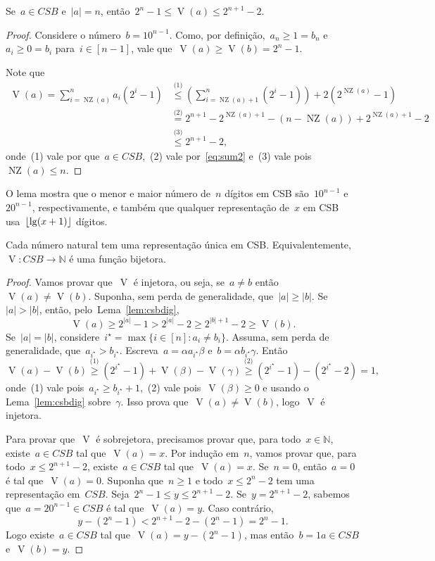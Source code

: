 \documentclass[main.tex]{subfiles}
\newcommand{\NZ}{\operatorname{NZ}}
\newcommand{\CSB}{\textit{CSB}}
\renewcommand{\V}{\operatorname{V}}
\begin{document}
\begin{lemma} \label{lem:csbdig}
	Se~$a \in \CSB$ e~$|a| = n$, então~$2^n - 1 \leq \V(a) \leq 2^{n+1}-2$.
\end{lemma}
\begin{proof}
	Considere o número~$b = 10^{n-1}$. Como, por definição,~$a_n \geq 1 = b_n$ e~$a_i \geq 0 = b_i$ para~$i \in [n - 1]$, vale que~$\V(a) \geq \V(b) = 2^n - 1$.

	Note que
	\begin{align*}
	\V(a) = \sum\limits_{i = \NZ(a)}^n{a_i (2^i - 1)} &\stackrel{\text{(1)}}{\leq} \left(\sum\limits_{i = \NZ(a) + 1}^n (2^i - 1)\right) + 2 (2^{\NZ(a)} - 1) \\
	&\stackrel{\text{(2)}}{=} 2^{n+1} - 2^{\NZ(a)+1} - (n - \NZ(a)) + 2^{\NZ(a) + 1} - 2 \\
	&\stackrel{\text{(3)}}{\leq} 2^{n+1} - 2,
	\end{align*}
	onde~(1) vale por que~$a \in \CSB$,~(2) vale por~\eqref{eq:sum2} e~(3) vale pois~$\NZ(a) \leq n$.
\end{proof}

O lema mostra que o menor e maior número de~$n$ dígitos em CSB são~$10^{n-1}$ e~$20^{n-1}$, respectivamente, e também que qualquer representação de~$x$ em CSB usa~$\lfloor\lg(x + 1)\rfloor$ dígitos.

\begin{theorem} \label{thm:csbbij}
	Cada número natural tem uma representação única em CSB. Equivalentemente,~${\V: \CSB \rightarrow \mathbb{N}}$ é uma função bijetora.
\end{theorem}
\begin{proof}
	Vamos provar que~$\V$ é injetora, ou seja, se~${a \neq b}$ então~${\V(a) \neq \V(b)}$. Suponha, sem perda de generalidade, que~$|a| \geq |b|$. Se~$|a| > |b|$, então, pelo~Lema~\ref{lem:csbdig},
	$$ \V(a) \geq 2^{|a|} - 1 > 2^{|a|} - 2 \geq 2^{|b| + 1} - 2 \geq \V(b). $$
	Se~$|a| = |b|$, considere~${i^\star = \max\{i \in [n] : a_i \neq b_i\}}$. Assuma, sem perda de generalidade, que~${a_{i^\star} > b_{i^\star}}$. Escreva~${a = \alpha a_{i^\star} \beta}$ e~${b = \alpha b_{i^\star} \gamma}$. Então
	$$ \V(a) - \V(b) \stackrel{\text{(1)}}{\geq} (2^{i^\star} - 1) + \V(\beta) - \V(\gamma) \stackrel{\text{(2)}}{\geq} (2^{i^\star} - 1) - (2^{i^\star} - 2) = 1, $$
	onde~(1) vale pois~$a_{i^\star} \geq b_{i^\star} + 1$,~(2) vale pois~$\V(\beta) \geq 0$ e usando o Lema~\ref{lem:csbdig} sobre~$\gamma$. Isso prova que~$\V(a) \neq \V(b)$, logo~$\V$ é injetora.

	Para provar que~$\V$ é sobrejetora, precisamos provar que, para todo~$x \in \mathbb{N}$, existe~${a \in \CSB}$ tal que~${\V(a) = x}$. Por indução em~$n$, vamos provar que, para todo~${x \leq 2^{n+1} - 2}$, existe~${a \in \CSB}$ tal que~${\V(a) = x}$. Se~$n = 0$, então~$a = 0$ é tal que~$\V(a) = 0$. Suponha que~$n \geq 1$ e todo~${x \leq 2^n - 2}$ tem uma representação em~$\CSB$. Seja~${2^n - 1 \leq y \leq 2^{n+1} - 2}$. Se~$y = 2^{n+1} - 2$, sabemos que~${a = 20^{n-1} \in \CSB}$ é tal que~$\V(a) = y$. Caso contrário,~
	$$y - (2^n - 1) < 2^{n+1} - 2 - (2^n - 1) = 2^n - 1.$$
	Logo existe~$a \in \CSB$ tal que~${\V(a) = y - (2^n - 1)}$, mas então~$b = 1a \in \CSB$ e~$\V(b) = y$.
\end{proof}
\end{document}
